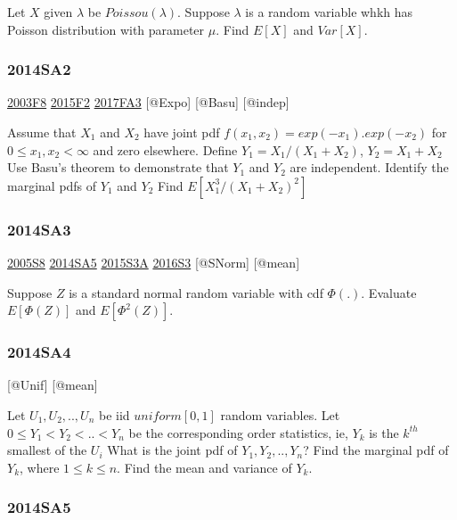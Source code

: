 \documentclass[6pt,Portrait]{article}
\begin{document}
Let \(X\) given \(\lambda\) be \(Poissou(\lambda)\). Suppose \(\lambda\)
is a random variable whkh has Poisson distribution with parameter
\(\mu\). Find \(E[X]\) and \(Var[X]\).

\hypertarget{sa2-2}{%
\subsubsection{2014SA2}\label{sa2-2}}

\protect\hyperlink{f8-1}{2003F8} \protect\hyperlink{f2-5}{2015F2}
\protect\hyperlink{fa3-3}{2017FA3} {[}@Expo{]} {[}@Basu{]} {[}@indep{]}

Assume that \(X_1\) and \(X_2\) have joint pdf
\(f(x_1,x_2)=exp(-x_1 ).exp(-x_2)\) for \(0\le x_1,x_2<\infty\) and zero
elsewhere. Define \(Y_1=X_1/(X_1+X_2)\), \(Y_2=X_1+X_2\) Use Basu's
theorem to demonstrate that \(Y_1\) and \(Y_2\) are independent.
Identify the marginal pdfs of \(Y_1\) and \(Y_2\) Find
\(E[X_1^3/(X_1+X_2)^2]\)

\hypertarget{sa3-2}{%
\subsubsection{2014SA3}\label{sa3-2}}

\protect\hyperlink{s8-1}{2005S8} \protect\hyperlink{sa5-1}{2014SA5}
\protect\hyperlink{s3a-1}{2015S3A} \protect\hyperlink{s3-4}{2016S3}
{[}@SNorm{]} {[}@mean{]}

Suppose \(Z\) is a standard normal random variable with cdf \(\Phi(.)\).
Evaluate \(E[\Phi(Z)]\) and \(E[\Phi^{2}(Z)]\).

\hypertarget{sa4-2}{%
\subsubsection{2014SA4}\label{sa4-2}}

{[}@Unif{]} {[}@mean{]}

Let \(U_1,U_2,..,U_n\) be iid \(uniform[0,1]\) random variables. Let
\(0\le Y_1<Y_2<..<Y_n\) be the corresponding order statistics, ie,
\(Y_k\) is the \(k^{th}\) smallest of the \(U_i\) What is the joint pdf
of \(Y_1,Y_2,..,Y_n\)? Find the marginal pdf of \(Y_k\), where
\(1\le k\le n\). Find the mean and variance of \(Y_k\).

\hypertarget{sa5-1}{%
\subsubsection{2014SA5}\label{sa5-1}}
\end{document}
